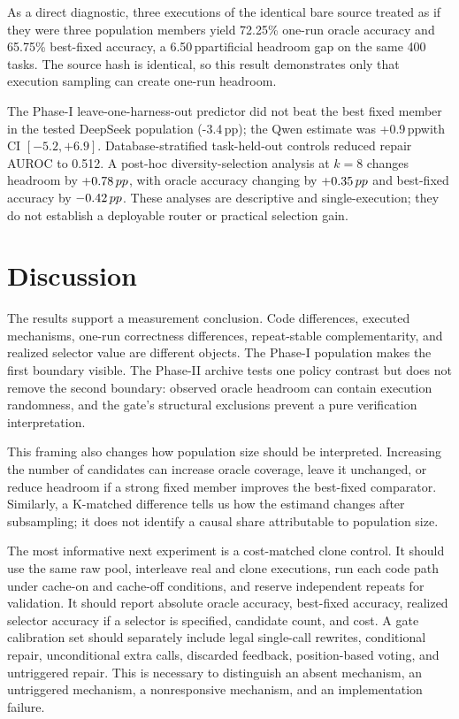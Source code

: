 \documentclass{article}
\newcommand{\pp}{\,pp}
\begin{document}
As a direct diagnostic, three executions of the identical bare source treated
as if they were three population members yield 72.25\% one-run oracle accuracy
and 65.75\% best-fixed accuracy, a 6.50\pp artificial headroom gap on the same
400 tasks. The source hash is identical, so this result demonstrates only that
execution sampling can create one-run headroom.

The Phase-I leave-one-harness-out predictor did not beat the best fixed member
in the tested DeepSeek population (-3.4\pp); the Qwen estimate was +0.9\pp with
CI $[-5.2,+6.9]$. Database-stratified task-held-out controls reduced repair
AUROC to 0.512. A post-hoc diversity-selection analysis at $k=8$ changes
headroom by $\RevisionWoneHeadroom\pp$, with oracle accuracy changing by
$\RevisionWoneOracle\pp$ and best-fixed accuracy by $\RevisionWoneBest\pp$.
These analyses are descriptive and single-execution; they do not establish a
deployable router or practical selection gain.

\section{Discussion}

The results support a measurement conclusion. Code differences, executed
mechanisms, one-run correctness differences, repeat-stable complementarity,
and realized selector value are different objects. The Phase-I population makes
the first boundary visible. The Phase-II archive tests one policy contrast but
does not remove the second boundary: observed oracle headroom can contain
execution randomness, and the gate's structural exclusions prevent a pure
verification interpretation.

This framing also changes how population size should be interpreted. Increasing
the number of candidates can increase oracle coverage, leave it unchanged, or
reduce headroom if a strong fixed member improves the best-fixed comparator.
Similarly, a K-matched difference tells us how the estimand changes after
subsampling; it does not identify a causal share attributable to population
size.

The most informative next experiment is a cost-matched clone control. It should
use the same raw pool, interleave real and clone executions, run each code path
under cache-on and cache-off conditions, and reserve independent repeats for
validation. It should report absolute oracle accuracy, best-fixed accuracy,
realized selector accuracy if a selector is specified, candidate count, and
cost. A gate calibration set should separately include legal single-call
rewrites, conditional repair, unconditional extra calls, discarded feedback,
position-based voting, and untriggered repair. This is necessary to distinguish
an absent mechanism, an untriggered mechanism, a nonresponsive mechanism, and
an implementation failure.
\end{document}
